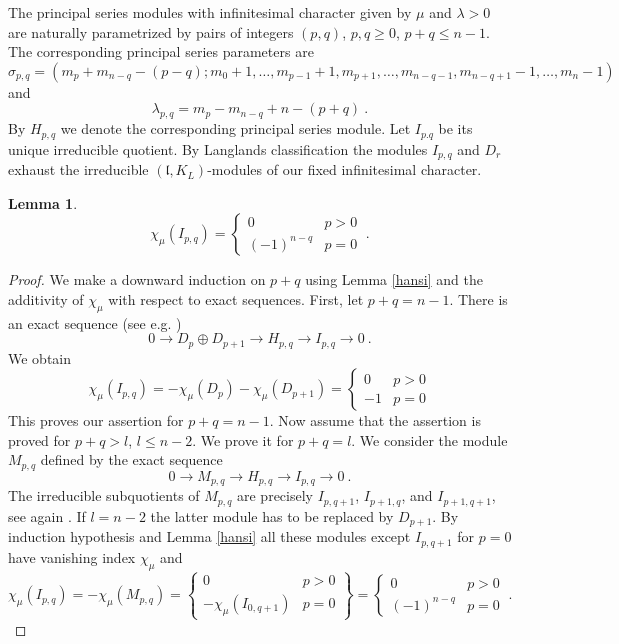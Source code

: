 \documentclass[10]{amsart}
\newtheorem{lem}[thm]{Lemma}
\theoremstyle{remark}
\theoremstyle{definition}
\numberwithin{equation}{section}
\newcommand{\ind}{{\chi}}
\newcommand{\fl}{{\mathfrak l}}
\begin{document}
{The principal series modules with infinitesimal character given by $\mu$ and $\lambda>0$ are naturally parametrized by pairs of integers $(p,q)$, $p,q\ge 0$, $p+q\le n-1$. The corresponding
principal series parameters are
$$ \sigma_{p,q}=(m_p+m_{n-q}-(p-q); m_0+1,\dots,m_{p-1}+1,m_{p+1},\dots,m_{n-q-1},m_{n-q+1}-1,\dots,m_n-1)$$
and
$$ \lambda_{p,q}=m_p-m_{n-q}+n-(p+q)\ .$$
By $H_{p,q}$ we denote the corresponding principal series module. Let $I_{p.q}$ be its unique irreducible quotient. By Langlands classification the modules $I_{p,q}$ and $D_r$ exhaust the irreducible $(\fl,K_L)$-modules of our fixed infinitesimal character.
\begin{lem}\label{fritzsch}
$$ \ind_\mu(I_{p,q})=\left\{\begin{array}{cc} 0&p>0\\(-1)^{n-q}&p=0\end{array} \right. \ .$$
\end{lem}

\begin{proof}
We make a downward induction on $p+q$ using Lemma \ref{hansi} and the additivity of $\ind_\mu$ with respect to exact sequences. First, let $p+q=n-1$.
There is an exact sequence (see e.g. \cite{Co85})
$$ 0\rightarrow D_p\oplus D_{p+1}\longrightarrow H_{p,q}\longrightarrow I_{p,q}\rightarrow 0\ .$$
We obtain 
$$ \ind_\mu(I_{p,q})=-\ind_\mu(D_p)-\ind_\mu(D_{p+1})=\left\{\begin{array}{cc} 0&p>0\\-1&p=0\end{array} \right.$$
This proves our assertion for $p+q=n-1$. Now assume that the assertion is proved for $p+q>l$, $l\le n-2$. We prove it for $p+q=l$. We consider the module $M_{p,q}$ defined
by the exact sequence
$$ 0\rightarrow M_{p,q}\longrightarrow H_{p,q}\longrightarrow I_{p,q}\rightarrow 0\ .$$
The irreducible subquotients of $M_{p,q}$ are precisely $I_{p,q+1}$, $I_{p+1,q}$, and $I_{p+1,q+1}$, see again \cite{Co85}. If $l=n-2$ the latter module has to be 
replaced by $D_{p+1}$.
By induction hypothesis and Lemma \ref{hansi} all these modules except $I_{p,q+1}$ for $p=0$ have vanishing index $\chi_\mu$ and
$$ \ind_\mu(I_{p,q})=-\ind_\mu (M_{p,q})= \left\{\begin{array}{cc} 0&p>0\\-\ind_\mu(I_{0,q+1})&p=0\end{array} \right\}=\left\{\begin{array}{cc} 0&p>0\\(-1)^{n-q}&p=0\end{array} \right.\ .$$
\end{proof}

}
\end{document}
